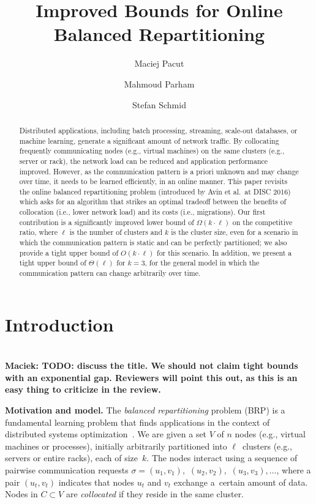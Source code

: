 \documentclass[manuscript,screen=true, review, anonymous]{acmart}
\title{Improved Bounds for Online Balanced Repartitioning}
\author{Maciej Pacut}
\affiliation{%
  \institution{Faculty of Computer Science, University of Vienna}
  \country{Austria}
}
\author{Mahmoud Parham}
\affiliation{%
  \institution{Faculty of Computer Science, University of Vienna}
  \country{Austria}
}
\author{Stefan Schmid}
\affiliation{%
  \institution{Faculty of Computer Science, University of Vienna}
  \country{Austria}
}
\newcommand{\OBRP}{BRP}
\newcommand\maciek[1]{\color{brown}\textbf{\\ Maciek: #1}\color{black}}
\begin{document}
\begin{abstract}
Distributed   applications,  including  batch  processing, streaming, scale-out databases,
or machine learning, generate a significant amount of network traffic. By collocating frequently communicating nodes (e.g., virtual machines) on the same clusters (e.g., server or rack), the network load can be reduced and application performance improved. 
However, as the communication pattern is a priori unknown and may change over time, it needs to be learned efficiently, in an online manner.
%
This paper revisits the online 
balanced repartitioning problem 
(introduced by Avin et al.~at DISC 2016)
which asks for an algorithm that strikes
an optimal tradeoff between the benefits
of collocation (i.e., lower network load) 
and its costs (i.e., migrations). 
%
Our first contribution is a significantly improved
lower bound of $\Omega(k\cdot \ell)$ on the
competitive ratio, where $\ell$ is the number
of clusters and $k$ is the cluster size,
even for a scenario in which the communication
pattern is static and can be perfectly partitioned;
we also provide a tight upper bound 
of $O(k\cdot \ell)$ for this scenario.
In addition, we present a tight upper bound
of $\Theta(\ell)$ for $k=3$,
for the general model in which the
communication pattern can change arbitrarily
over time. 
\end{abstract}
    
\maketitle
    
\renewcommand{\shortauthors}{M.~Pacut, M.~Parham, S.~Schmid}

\section{Introduction}

\maciek{TODO: discuss the title. We should not claim tight bounds with an exponential gap. Reviewers will point this out, as this is an easy thing to criticize in the review.}

\noindent \textbf{Motivation and model.}
The \emph{balanced repartitioning} problem (\OBRP{})
is a fundamental learning problem
that finds applications in the context of
distributed systems optimization~\cite{repartition-disc}. We are given a set $V$ of $n$ nodes 
(e.g., virtual machines or processes),
initially arbitrarily partitioned into $\ell$~clusters
(e.g., servers or entire racks),
each of size~$k$.
The nodes interact using
a sequence of pairwise communication requests
$\sigma = (u_1,v_1),$ $(u_2,v_2),$ $(u_3,v_3), \ldots$,
where a pair $(u_t,v_t)$ indicates that nodes $u_t$ and $v_t$ exchange a~certain amount of data.
Nodes in $C \subset V$ are \emph{collocated}
if they reside in the same cluster.
\end{document}
